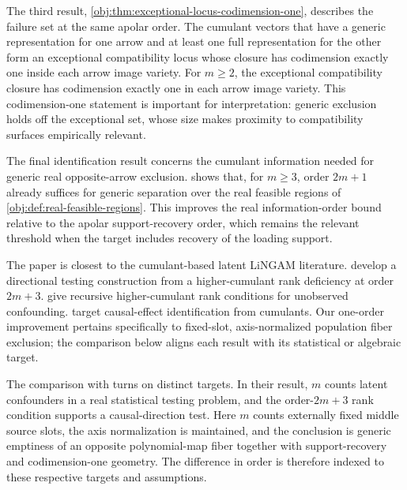 The third result, \cref{obj:thm:exceptional-locus-codimension-one}, describes the failure set at the same apolar order. The cumulant vectors that have a generic representation for one arrow and at least one full representation for the other form an exceptional compatibility locus whose closure has codimension exactly one inside each arrow image variety. For \(m\ge2\), the exceptional compatibility closure has codimension exactly one in each arrow image variety. This codimension-one statement is important for interpretation: generic exclusion holds off the exceptional set, whose size makes proximity to compatibility surfaces empirically relevant.

The final identification result concerns the cumulant information needed for generic real opposite-arrow exclusion.  shows that, for \(m\ge3\), order \(2m+1\) already suffices for generic separation over the real feasible regions of \cref{obj:def:real-feasible-regions}. This improves the real information-order bound relative to the apolar support-recovery order, which remains the relevant threshold when the target includes recovery of the loading support.

The paper is closest to the cumulant-based latent LiNGAM literature. \citet{ChenPengHuangEtAl2025Direction} develop a directional testing construction from a higher-cumulant rank deficiency at order \(2m+3\). \citet{SchkodaRobevaDrton2024} give recursive higher-cumulant rank conditions for unobserved confounding. \citet{TramontanoKivvaSalehkaleybarDrtonKiyavash2024,TramontanoKivvaSalehkaleybarDrtonKiyavash2025} target causal-effect identification from cumulants. Our one-order improvement pertains specifically to fixed-slot, axis-normalized population fiber exclusion; the comparison below aligns each result with its statistical or algebraic target.

The comparison with \citet{ChenPengHuangEtAl2025Direction} turns on distinct targets. In their result, \(m\) counts latent confounders in a real statistical testing problem, and the order-\(2m+3\) rank condition supports a causal-direction test. Here \(m\) counts externally fixed middle source slots, the axis normalization is maintained, and the conclusion is generic emptiness of an opposite polynomial-map fiber together with support-recovery and codimension-one geometry. The difference in order is therefore indexed to these respective targets and assumptions.

